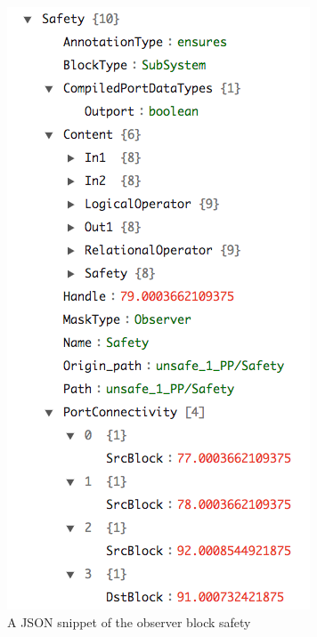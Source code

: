 \documentclass{article}
\begin{document}
\begin{figure}[h]
\begin{center}
  \includegraphics[scale=0.35]{figures/safety}
\end{center}  
  \caption{A JSON snippet of the observer block safety}
  \label{jsonsafety}
\end{figure}
\end{document}
